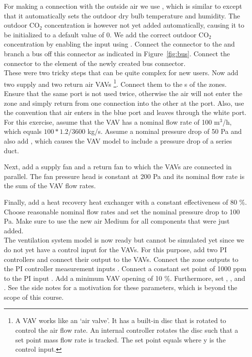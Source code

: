 \documentclass[10pt,a4paper]{article}
\begin{document}
For making a connection with the outside air we use ,
which is similar to  except that it 
automatically sets the outdoor dry bulb temperature and humidity.
The outdoor CO$_2$ concentration is however not yet added automatically,
causing it to be initialized to a default value of 0.
We add the correct outdoor CO$_2$ concentration by
enabling the input  using .
Connect the connector  to the 
and branch a bus off this connector as indicated in Figure~\ref{fig:bus}.
Connect the connector  to the element  of
the newly created bus connector.\\

These were two tricky steps that can be quite complex for new users. 
Now add two supply and two return air VAVs
\footnote{A VAV works like an `air valve'. It has a built-in disc that is rotated to control the 
air flow rate. An internal controller rotates the disc such that a set point mass flow rate is tracked.
The set point equals  where y is the control input.}.
Connect them to the s of the zones. 
Ensure that the same port is not used twice, otherwise
the air will not enter the zone and simply return from one 
connection into the other at the port.
Also, use the convention that air enters in the blue port and leaves
through the white port.
For this exercise, assume that the VAV has a nominal flow rate of 100 m$^3$/h,
which equals $100*1.2/3600$ kg/s.
Assume a nominal pressure drop of 50 Pa and
also add , which causes the VAV
model to include a pressure drop of a series duct.

Next, add a supply fan and a return fan to which the VAVs
are connected in parallel. The fan pressure head is constant at 200 Pa
and its nominal flow rate is the sum of the VAV flow rates.

Finally, add a heat recovery heat exchanger with a constant effectiveness of 80 \%.
Choose reasonable nominal flow rates and set the nominal pressure drop to 100 Pa.
Make sure to use the new air Medium for all components that were just added.\\

The ventilation system model is now ready but cannot be simulated yet since
we do not yet have a control input for the VAVs.
For this purpose, add two PI controllers and connect their output to the VAVs.
Connect the zone  outputs to the PI controller measurement inputs .
Connect a constant set point of 1000 ppm to the PI input .
Add a minimum VAV opening of 10 \%.
Furthermore, set ,  ,  and . 
See the side notes for a motivation for these parameters, 
which is beyond the scope of this course.
\end{document}
